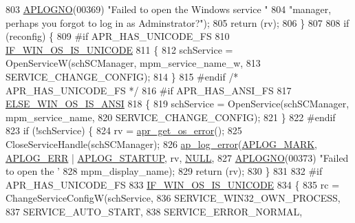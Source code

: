 \begin{DoxyCode}
{{803                      \hyperlink{group__APACHE__CORE__LOG_ga1dee8a07e06bc5b3de8b89662c2cd666}{APLOGNO}(00369)  \textcolor{stringliteral}{"Failed to open the Windows service "}
804                      \textcolor{stringliteral}{"manager, perhaps you forgot to log in as Adminstrator?"});
805         \textcolor{keywordflow}{return} (rv);
806     \}
807 
808     \textcolor{keywordflow}{if} (reconfig) \{
809 \textcolor{preprocessor}{#if APR\_HAS\_UNICODE\_FS}
810         \hyperlink{win32_2apr__arch__misc_8h_a8c631486790f65bd87ed0623a25bdd3d}{IF\_WIN\_OS\_IS\_UNICODE}
811         \{
812             schService = OpenServiceW(schSCManager, mpm\_service\_name\_w,
813                                       SERVICE\_CHANGE\_CONFIG);
814         \}
815 \textcolor{preprocessor}{#endif }\textcolor{comment}{/* APR\_HAS\_UNICODE\_FS */}\textcolor{preprocessor}{}
816 \textcolor{preprocessor}{#if APR\_HAS\_ANSI\_FS}
817         \hyperlink{win32_2apr__arch__misc_8h_a2d1423da7a6a46da1276017c8140be22}{ELSE\_WIN\_OS\_IS\_ANSI}
818         \{
819             schService = OpenService(schSCManager, mpm\_service\_name,
820                                      SERVICE\_CHANGE\_CONFIG);
821         \}
822 \textcolor{preprocessor}{#endif}
823         \textcolor{keywordflow}{if} (!schService) \{
824             rv = \hyperlink{group__apr__errno_gaa76e122da00af0ce2e8c8d7ff538bdfa}{apr\_get\_os\_error}();
825             CloseServiceHandle(schSCManager);
826             \hyperlink{group__APACHE__CORE__LOG_ga5e6676c87418af7a1d323a116c78ecb4}{ap\_log\_error}(\hyperlink{group__APACHE__CORE__LOG_ga655e126996849bcb82e4e5a14c616f4a}{APLOG\_MARK}, \hyperlink{group__APACHE__CORE__LOG_ga57ad94ed8c92c4306de90479251a5d58}{APLOG\_ERR} | 
      \hyperlink{group__APACHE__CORE__LOG_ga39efd19b052fb6f39d8f263c16cc82b7}{APLOG\_STARTUP}, rv, \hyperlink{pcre_8txt_ad7f989d16aa8ca809a36bc392c07fba1}{NULL},
827                          \hyperlink{group__APACHE__CORE__LOG_ga1dee8a07e06bc5b3de8b89662c2cd666}{APLOGNO}(00373) \textcolor{stringliteral}{"Failed to open the '%
828                          mpm\_display\_name);
829             \textcolor{keywordflow}{return} (rv);
830         \}
831 
832 \textcolor{preprocessor}{#if APR\_HAS\_UNICODE\_FS}
833         \hyperlink{win32_2apr__arch__misc_8h_a8c631486790f65bd87ed0623a25bdd3d}{IF\_WIN\_OS\_IS\_UNICODE}
834         \{
835             rc = ChangeServiceConfigW(schService,
836                                       SERVICE\_WIN32\_OWN\_PROCESS,
837                                       SERVICE\_AUTO\_START,
838                                       SERVICE\_ERROR\_NORMAL,
}}}
\end{DoxyCode}
